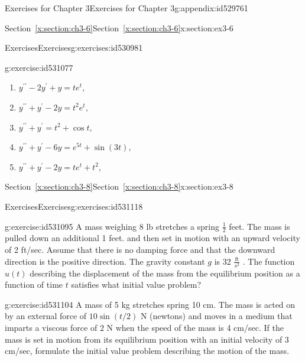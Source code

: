 \documentclass[oneside,10pt,]{book}
\newcommand{\xreffont}{\relax}
\numberwithin{equation}{section}
\numberwithin{equation}{section}
\begin{document}
\begin{appendixptx}{Exercises for Chapter 3}{}{Exercises for Chapter 3}{}{}{g:appendix:id529761}
\begin{sectionptx}{Section~{\xreffont\ref*{x:section:ch3-6}}}{}{Section~{\xreffont\ref*{x:section:ch3-6}}}{}{}{x:section:ex3-6}
\begin{exercises-subsection-numberless}{Exercises}{}{Exercises}{}{}{g:exercises:id530981}
\begin{divisionexercise}{8}{}{}{g:exercise:id531077}
\begin{enumerate}[label=(\alph*)]
\item{}\(\displaystyle y^{\prime\prime}-2y^{\prime}+y=te^{t},\)%
\item{}\(\displaystyle y^{\prime\prime}+y^{\prime}-2y=t^{2}e^{t},\)%
\item{}\(\displaystyle y^{\prime\prime}+y^{\prime}=t^{2}+\cos t,\)%
\item{}\(\displaystyle y^{\prime\prime}+y^{\prime}-6y=e^{5t}+\sin(3t),\)%
\item{}\(\displaystyle y^{\prime\prime}+y^{\prime}-2y=te^{t}+t^{2},\)%
\end{enumerate}
%
\end{divisionexercise}%
\end{exercises-subsection-numberless}
\end{sectionptx}
%
%
\typeout{************************************************}
\typeout{Section D.6 Section~{\xreffont\ref*{x:section:ch3-8}}}
\typeout{************************************************}
%
\begin{sectionptx}{Section~{\xreffont\ref*{x:section:ch3-8}}}{}{Section~{\xreffont\ref*{x:section:ch3-8}}}{}{}{x:section:ex3-8}
%
%
\typeout{************************************************}
\typeout{************************************************}
%
\begin{exercises-subsection-numberless}{Exercises}{}{Exercises}{}{}{g:exercises:id531118}
\begin{divisionexercise}{1}{}{}{g:exercise:id531095}%
A mass weighing \(8\) lb stretches a spring \(\frac{1}{2}\) feet. The mass is pulled down an additional 1 feet. and then set in motion with an upward velocity of 2 ft\slash{}sec. Assume that there is no damping force and that the downward direction is the positive direction. The gravity constant \(g\) is 32 \(\frac{\text{ft}}{s^{2}}\) . The function \(u(t)\) describing the displacement of the mass from the equilibrium position as a function of time \(t\) satisfies what initial value problem?%
\end{divisionexercise}%
\begin{divisionexercise}{2}{}{}{g:exercise:id531104}%
A mass of 5 kg stretches spring 10 cm. The mass is acted on by an external force of \(10\sin(t/2)\) N (newtons) and moves in a medium that imparts a viscous force of \(2\) N when the speed of the mass is 4 cm\slash{}sec. If the mass is set in motion from its equilibrium position with an initial velocity of 3 cm\slash{}sec, formulate the initial value problem describing the motion of the mass.%

\end{divisionexercise}
\end{exercises-subsection-numberless}
\end{sectionptx}
\end{appendixptx}
\end{document}
